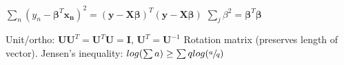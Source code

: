 $\sum_n (y_{n} -\mathbf{\beta}^T\mathbf{x_n})^2 = (\mathbf{y} - \mathbf{X}\mathbf{\beta})^T(\mathbf{y} - \mathbf{X}\mathbf{\beta})$
\newline
$\sum_j \beta^2 = \mathbf{\beta}^T \mathbf{\beta}$

Unit/ortho: $\mathbf{U}\mathbf{U}^T=\mathbf{U}^T\mathbf{U} = \mathbf{I}$, \newline $\mathbf{U}^T = \mathbf{U}^{-1}$ Rotation matrix (preserves length of vector).
Jensen's inequality: \newline $log(\sum a) \ge \sum q log(\sfrac{a}{q})$
